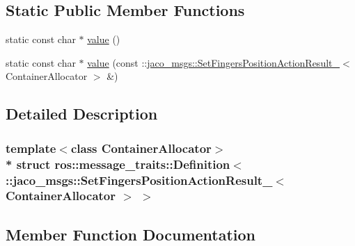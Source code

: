 \subsection*{Static Public Member Functions}
\begin{DoxyCompactItemize}
\item 
static const char $\ast$ \hyperlink{structros_1_1message__traits_1_1Definition_3_01_1_1jaco__msgs_1_1SetFingersPositionActionResult_d77f823cc2975df7a63f01b98938519f_a66448123fcd55046650a46be8972c13f}{value} ()
\item 
static const char $\ast$ \hyperlink{structros_1_1message__traits_1_1Definition_3_01_1_1jaco__msgs_1_1SetFingersPositionActionResult_d77f823cc2975df7a63f01b98938519f_a542d8984da47f6ff43bd9a20cc742213}{value} (const \+::\hyperlink{structjaco__msgs_1_1SetFingersPositionActionResult__}{jaco\+\_\+msgs\+::\+Set\+Fingers\+Position\+Action\+Result\+\_\+}$<$ Container\+Allocator $>$ \&)
\end{DoxyCompactItemize}


\subsection{Detailed Description}
\subsubsection*{template$<$class Container\+Allocator$>$\\*
struct ros\+::message\+\_\+traits\+::\+Definition$<$ \+::jaco\+\_\+msgs\+::\+Set\+Fingers\+Position\+Action\+Result\+\_\+$<$ Container\+Allocator $>$ $>$}



\subsection{Member Function Documentation}
